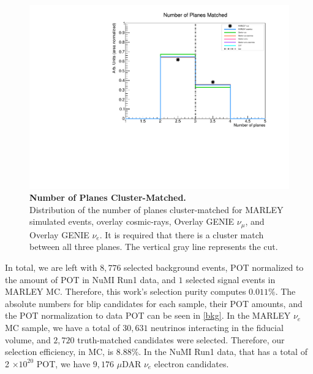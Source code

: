 \begin{figure}[h!]
    \centering
    \includegraphics[width=120mm]{Figures/blip_n_planes.pdf}
    \caption[Number of Planes Cluster-Matched.]{{\textbf{Number of Planes Cluster-Matched.}}\\ Distribution of the number of planes cluster-matched for MARLEY simulated events, overlay cosmic-rays, Overlay GENIE $\nu_{\mu}$, and Overlay GENIE $\nu_{e}$. It is required that there is a cluster match between all three planes. The vertical gray line represents the cut.}
 \label{blip_nplanes}
\end{figure}

In total, we are left with $8,776$ selected background events, POT normalized to the amount of POT in NuMI Run1 data, and $1$ selected signal events in MARLEY MC. Therefore, this work's selection purity computes $0.011\%$. The absolute numbers for blip candidates for each sample, their POT amounts, and the POT normalization to data POT can be seen in \ref{bkg}. In the MARLEY $\nu_{e}$ MC sample, we have a total of $30,631$ neutrinos interacting in the fiducial volume, and $2,720$ truth-matched candidates were selected. Therefore, our selection efficiency, in MC, is $8.88\%$. In the NuMI Run1 data, that has a total of 2 $\times 10^{20}$ POT, we have $9,176$ $\mu$DAR $\nu_e$ electron candidates.   

